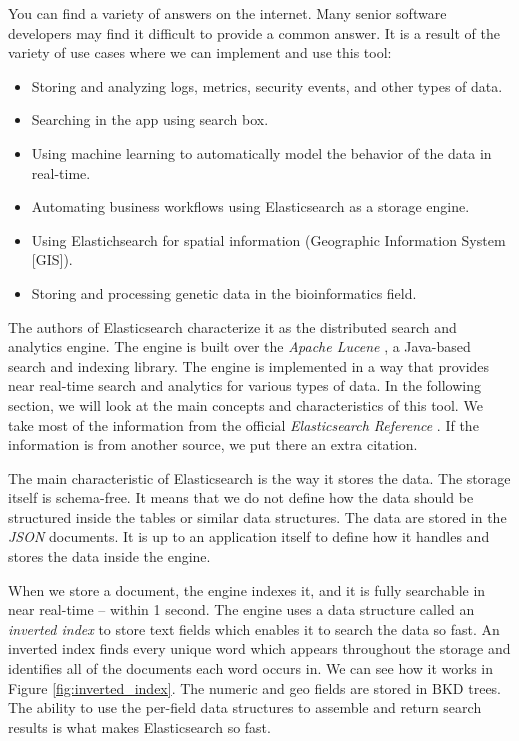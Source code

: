 \documentclass[12pt,a4,twoside]{article}
\begin{document}
You can find a variety of answers on the internet. Many senior software developers may find it difficult to provide a common answer. It is a result of the variety of use cases where we can implement and use this tool:

\begin{itemize}
\item Storing and analyzing logs, metrics, security events, and other types of data.
\item Searching in the app using search box.
\item Using machine learning to automatically model the behavior of the data in real-time.
\item Automating business workflows using Elasticsearch as a storage engine.
\item Using Elastichsearch for spatial information (Geographic Information System [GIS]).
\item Storing and processing genetic data in the bioinformatics field. \cite{elasticsearch_reference}
\end{itemize}

The authors of Elasticsearch characterize it as the distributed search and analytics engine. The engine is built over the \textit{Apache Lucene} \cite{apache_lucene}, a Java-based search and indexing library. The engine is implemented in a way that provides near real-time search and analytics for various types of data. In the following section, we will look at the main concepts and characteristics of this tool. We take most of the information from the official \textit{Elasticsearch Reference} \cite{elasticsearch_reference}. If the information is from another source, we put there an extra citation.

The main characteristic of Elasticsearch is the way it stores the data. The storage itself is schema-free. It means that we do not define how the data should be structured inside the tables or similar data structures. The data are stored in the \textit{JSON} documents. It is up to an application itself to define how it handles and stores the data inside the engine.

When we store a document, the engine indexes it, and it is fully searchable in near real-time -- within 1 second. The engine uses a data structure called an \textit{inverted index} to store text fields which enables it to search the data so fast. An inverted index finds every unique word which appears throughout the storage and identifies all of the documents each word occurs in. We can see how it works in Figure \ref{fig:inverted_index}. The numeric and geo fields are stored in BKD trees. The ability to use the per-field data structures to assemble and return search results is what makes Elasticsearch so fast.
\end{document}
